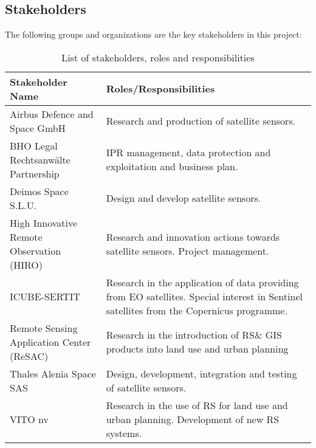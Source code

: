 \subsection{Stakeholders}
The following groups and organizations are the key stakeholders in this project:
\begin{table}[H]
\centering
\begin{tabular}{p{6cm}p{8cm}}
\toprule[2pt]
\textbf{Stakeholder Name  }                  & \textbf{Roles/Responsibilities                                                                                                                  } \\ \midrule[1.5pt]
Airbus Defence and Space GmbH       & Research and production of satellite sensors.                                                                                            \\ \hline
BHO Legal Rechtsanwälte Partnership & IPR management, data protection and exploitation and business plan.                                                                      \\ \hline
Deimos Space S.L.U.                 & Design and develop satellite sensors.                                                                                                    \\ \hline
High Innovative Remote Observation (HIRO)                                & Research and innovation actions towards satellite sensors. Project management.                                                           \\ \hline
ICUBE-SERTIT                        & Research in the application of data providing from EO satellites. Special interest in Sentinel satellites from the Copernicus programme. \\ \hline
Remote Sensing Application Center (ReSAC)                               & Research in the introduction of RS\& GIS products into land use and urban planning                                                         \\ \hline
Thales Alenia Space SAS             & Design, development, integration and testing of satellite sensors.                                                                       \\ \hline
VITO nv                             & Research in the use of RS for land use and urban planning. Development of new RS systems.                                                \\ \bottomrule[2pt]
\end{tabular}
\caption{List of stakeholders, roles and responsibilities}
\label{table_stakeholders}
\end{table}